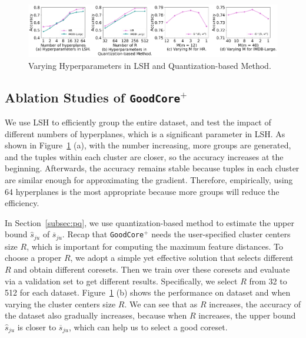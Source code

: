 
\begin{figure}
	\centering
	\includegraphics[width=1\textwidth]{figs/M}
	\vspace{-1em}
	\caption{Varying Hyperparameters in LSH and Quantization-based Method.}
	\label{fig:pq-exp}
	\vspace{-1em}
\end{figure}

\subsection{Ablation Studies of \texttt{GoodCore}$^+$}
%
We use LSH to efficiently group the entire dataset, and test the impact of  different numbers of hyperplanes, which is a significant parameter in LSH.
 As shown in Figure~\ref{fig:pq-exp} (a), with the number increasing, more groups are generated, and the tuples within each cluster are closer, so the  accuracy increases at the beginning. Afterwards, the accuracy remains stable because tuples in each cluster are similar enough for  approximating the gradient. Therefore, empirically, using  64 hyperplanes is the most appropriate because more groups will reduce the efficiency.

 In Section~\ref{subsec:pq}, we use quantization-based method to estimate the upper bound $\hat{s}_{ju}$ of $\overline{s}_{ju}$. Recap that \texttt{GoodCore}$^+$ needs the user-specified cluster centers size $R$, which is important for computing the maximum feature distances.
%
 To choose a proper $R$, we adopt a simple yet effective solution that selects different $R$ and obtain different coresets. Then we train over these coresets and evaluate via a validation set to get different results. Specifically, we select $R$ from 32 to 512 for each dataset. Figure~\ref{fig:pq-exp} (b) shows the performance on dataset \hr and \imdbl when varying the cluster centers size $R$.  We can see that as $R$ increases, the accuracy of the dataset also gradually increases, because when $R$ increases, the upper bound $\hat{s}_{ju}$ is closer to $\overline{s}_{ju}$, which can help us to select a good coreset.



